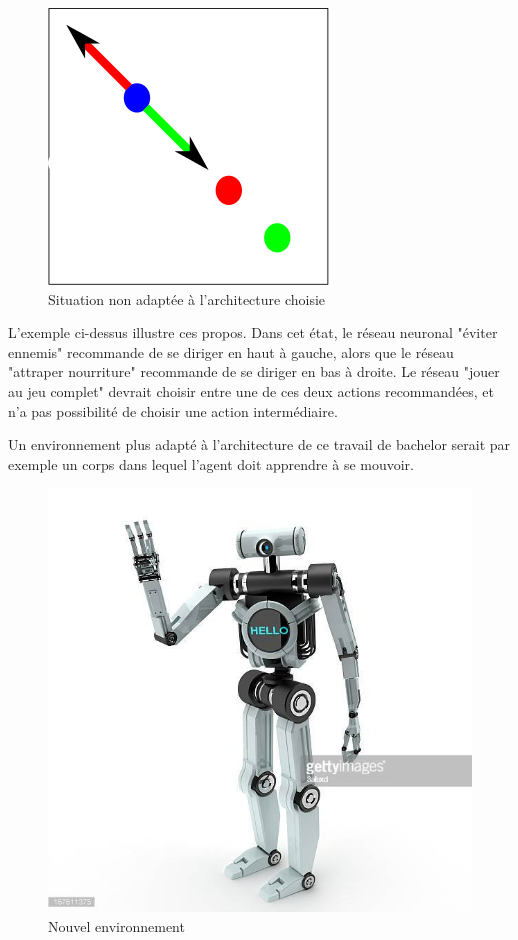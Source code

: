 \documentclass[11pt,a4paper]{report}
\begin{document}
   \begin{figure}[!h]
   \center
   \includegraphics[scale=0.3]{ressources/percpective.png}
   \caption{Situation non adaptée à l'architecture choisie}
   \end{figure} 

  
  \par L'exemple ci-dessus illustre ces propos. Dans cet état, le réseau neuronal "éviter ennemis" recommande de se diriger en haut à gauche, alors que le réseau  "attraper nourriture" recommande de se diriger en bas à droite. Le réseau "jouer au jeu complet" devrait choisir entre une de ces deux actions recommandées, et n'a pas possibilité de choisir une action intermédiaire. 
  
  \par Un environnement plus adapté à l'architecture de ce travail de bachelor serait par exemple un corps dans lequel l'agent doit apprendre à se mouvoir. 
  
   \begin{figure}[!h]
   \center
   \includegraphics[scale=1]{ressources/robot.jpg}
   \caption{Nouvel environnement}
   \end{figure} 
   
\end{document}
